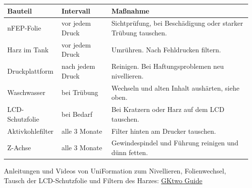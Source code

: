 \documentclass{\basedir/fablab-document}
\begin{document}
\begin{center}
	\small
	\renewcommand{\arraystretch}{1.3}
	\begin{tabularx}{\textwidth}{|l|l|X|}
		\hline
		\textbf{Bauteil} & \textbf{Intervall} & \textbf{Maßnahme} \\ \hline
		nFEP-Folie & vor jedem Druck & Sichtprüfung, bei Beschädigung oder starker Trübung tauschen. \\ \hline
		Harz im Tank & vor jedem Druck & Umrühren. Nach Fehldrucken filtern. \\ \hline
		Druckplattform & nach jedem Druck & Reinigen. Bei Haftungsproblemen neu nivellieren. \\ \hline
		Waschwasser & bei Trübung & Wechseln und alten Inhalt aushärten, siehe oben. \\ \hline
		LCD-Schutzfolie & bei Bedarf & Bei Kratzern oder Harz auf dem LCD tauschen. \\ \hline
		Aktivkohlefilter & alle 3 Monate & Filter hinten am Drucker tauschen. \\ \hline
		Z-Achse & alle 3 Monate & Gewindespindel und Führung reinigen und dünn fetten. \\ \hline
	\end{tabularx}
\end{center}

\noindent\begin{minipage}{0.75\textwidth}
	Anleitungen und Videos von UniFormation zum Nivellieren, Folienwechsel, Tausch der LCD-Schutzfolie und Filtern des Harzes: \href{https://uniformation3d.com/pages/gktwo-guide}{GKtwo Guide}
\end{minipage}\hfill
{}

\end{document}
